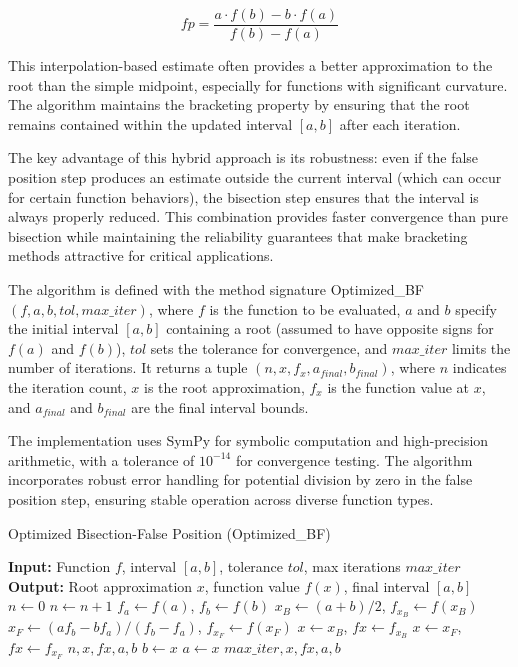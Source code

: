 \documentclass[amsmath, amssymb, aps]{revtex4-2}
\begin{document}
\begin{equation}
fp = \frac{a \cdot f(b) - b \cdot f(a)}{f(b) - f(a)}
\end{equation}

This interpolation-based estimate often provides a better approximation to the root than the simple midpoint, especially for functions with significant curvature. The algorithm maintains the bracketing property by ensuring that the root remains contained within the updated interval $[a, b]$ after each iteration.

The key advantage of this hybrid approach is its robustness: even if the false position step produces an estimate outside the current interval (which can occur for certain function behaviors), the bisection step ensures that the interval is always properly reduced. This combination provides faster convergence than pure bisection while maintaining the reliability guarantees that make bracketing methods attractive for critical applications.

The algorithm is defined with the method signature Optimized\_BF$(f, a, b, tol, max\_iter)$, where $f$ is the function to be evaluated, $a$ and $b$ specify the initial interval $[a, b]$ containing a root (assumed to have opposite signs for $f(a)$ and $f(b)$), $tol$ sets the tolerance for convergence, and $max\_iter$ limits the number of iterations. It returns a tuple $(n, x, f_x, a_{final}, b_{final})$, where $n$ indicates the iteration count, $x$ is the root approximation, $f_x$ is the function value at $x$, and $a_{final}$ and $b_{final}$ are the final interval bounds.

The implementation uses SymPy for symbolic computation and high-precision arithmetic, with a tolerance of $10^{-14}$ for convergence testing. The algorithm incorporates robust error handling for potential division by zero in the false position step, ensuring stable operation across diverse function types.

\begin{algorithm}[H]
\caption{Optimized Bisection-False Position (Optimized\_BF)}
\begin{algorithmic}[1]
\State \textbf{Input:} Function $f$, interval $[a, b]$, tolerance $tol$, max iterations $max\_iter$
\State \textbf{Output:} Root approximation $x$, function value $f(x)$, final interval $[a, b]$
\State $n \gets 0$
    \State $n \gets n + 1$
    \State $f_a \gets f(a)$, $f_b \gets f(b)$
    \State $x_B \gets (a + b)/2$, $f_{x_B} \gets f(x_B)$
    \State $x_F \gets (a f_b - b f_a)/(f_b - f_a)$, $f_{x_F} \gets f(x_F)$
        \State $x \gets x_B$, $fx \gets f_{x_B}$
    \Else
        \State $x \gets x_F$, $fx \gets f_{x_F}$
    \EndIf
        \State \Return $n, x, fx, a, b$
    \EndIf
        \State $b \gets x$
    \Else
        \State $a \gets x$
    \EndIf
\EndWhile
\State \Return $max\_iter, x, fx, a, b$
\end{algorithmic}
\end{algorithm}
\end{document}

